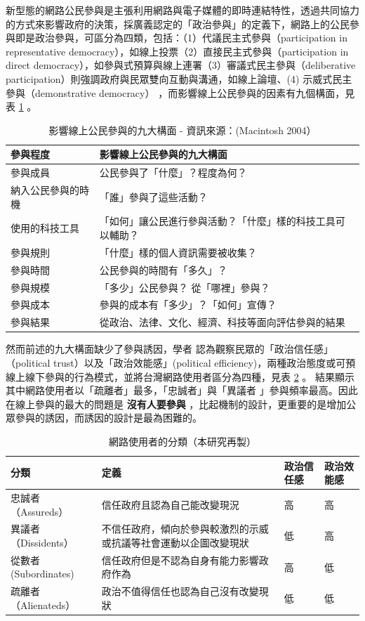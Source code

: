 \documentclass[12pt,a4paper]{article}
\begin{document}
新型態的網路公民參與是主張利用網路與電子媒體的即時連結特性，透過共同協力的方式來影響政府的決策，採廣義認定的「政治參與」的定義下，網路上的公民參與即是政治參與，可區分為四類，包括：（1）代議民主式參與（participation  in  representative  democracy），如線上投票（2）直接民主式參與（participation  in  direct  democracy），如參與式預算與線上連署（3）審議式民主參與（deliberative participation）則強調政府與民眾雙向互動與溝通，如線上論壇、(4) 示威式民主參與（demonstrative democracy）\citep{chen16} ，而影響線上公民參與的因素有九個構面，見表 \ref{tbl:online-participition} 。

\begin{table}[htbp]
\caption{\label{tbl:online-participition}
影響線上公民參與的九大構面 - 資訊來源：(Macintosh 2004）}
\centering
{}
\begin{tabular}{l|p{280pt}}
\toprule
參與程度 & 影響線上公民參與的九大構面\\
\midrule
參與成員 & 公民參與了「什麼」？程度為何？\\
納入公民參與的時機 & 「誰」參與了這些活動？\\
使用的科技工具 & 「如何」讓公民進行參與活動？「什麼」樣的科技工具可以輔助？\\
參與規則 & 「什麼」樣的個人資訊需要被收集？\\
參與時間 & 公民參與的時間有「多久」？\\
參與規模 & 「多少」公民參與？  從「哪裡」參與？\\
參與成本 & 參與的成本有「多少」？「如何」宣傳？\\
參與結果 & 從政治、法律、文化、經濟、科技等面向評估參與的結果\\
\bottomrule
\end{tabular}
\end{table}

然而前述的九大構面缺少了參與誘因，學者 \citep*{wang17}  認為觀察民眾的「政治信任感」（political trust）以及「政治效能感」(political efficiency)，兩種政治態度或可預線上線下參與的行為模式，並將台灣網路使用者區分為四種，見表 \ref{tbl:net-user-category} 。
結果顯示其中網路使用者以「疏離者」最多，「忠誠者」與「異議者 」參與頻率最高。因此在線上參與的最大的問題是 \textbf{沒有人要參與} ，比起機制的設計，更重要的是增加公眾參與的誘因，而誘因的設計是最為困難的。

\begin{table}[htbp]
\caption{\label{tbl:net-user-category}
網路使用者的分類（本研究再製）}
\centering
\small {}
\begin{tabular}{l|p{180pt}|l|l}
\toprule
分類 & 定義 & 政治信任感 & 政治效能感\\
\midrule
忠誠者（Assureds） & 信任政府且認為自己能改變現況 & 高 & 高\\
異議者（Dissidents） & 不信任政府，傾向於參與較激烈的示威或抗議等社會運動以企圖改變現狀 & 低 & 高\\
從數者 (Subordinates) & 信任政府但是不認為自身有能力影響政府作為 & 高 & 低\\
疏離者（Alienateds） & 政治不值得信任也認為自己沒有改變現狀 & 低 & 低\\
\bottomrule
\end{tabular}
\end{table}
\end{document}
